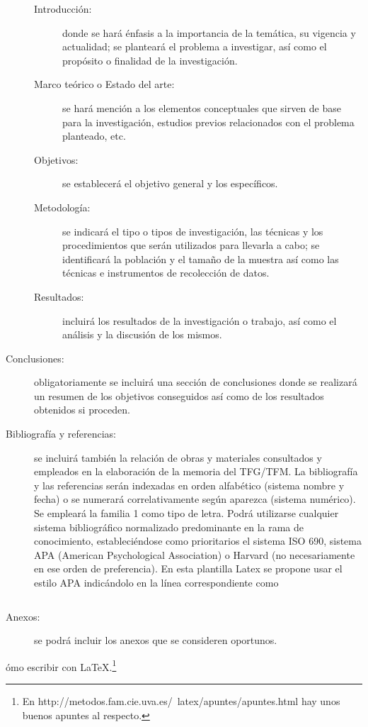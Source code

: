 \begin{description}
\begin{description}
\item[Introducción:] donde se hará énfasis a la importancia de la temática, su vigencia y actualidad; se planteará el problema a investigar, así como el propósito o finalidad de la investigación.
\item[Marco teórico o Estado del arte:] se hará mención a los elementos conceptuales que sirven de base para la investigación, estudios previos relacionados con el problema planteado, etc.
\item[Objetivos:] se establecerá el objetivo general y los específicos.
\item[Metodología:] se indicará el tipo o tipos de investigación, las técnicas y los procedimientos que serán utilizados para llevarla a cabo; se identificará la población y el tamaño de la muestra así como las técnicas e instrumentos de recolección de datos.
\item[Resultados:] incluirá los resultados de la investigación o trabajo, así como el análisis y la discusión de los mismos.
\end{description}
\item[Conclusiones:] obligatoriamente se incluirá una sección de conclusiones donde se realizará un resumen de los objetivos conseguidos así como de los resultados obtenidos si proceden.
\item[Bibliografía y referencias:] se incluirá también la relación de obras y materiales consultados y empleados en la elaboración de la memoria del TFG/TFM. La bibliografía y las referencias serán indexadas en orden alfabético (sistema nombre y fecha) o se numerará correlativamente según aparezca (sistema numérico). Se empleará la familia 1 como tipo de letra. Podrá utilizarse cualquier sistema bibliográfico normalizado predominante en la rama de conocimiento, estableciéndose como prioritarios el sistema ISO 690, sistema APA (American Psychological Association) o Harvard (no necesariamente en ese orden de preferencia). En esta plantilla Latex se propone usar el estilo APA indicándolo en la línea correspondiente como 
\begin{verbatim}

\end{verbatim}
\item[Anexos:] se podrá incluir los anexos que se consideren oportunos.

\end{description}


ómo escribir con  \LaTeX.\footnote{En http://metodos.fam.cie.uva.es/~latex/apuntes/apuntes.html hay unos buenos apuntes al respecto.}

